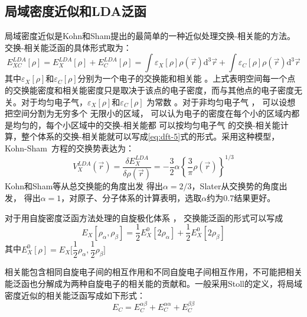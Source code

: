 \subsection{局域密度近似和LDA泛函}
局域密度近似是Kohn和Sham提出的最简单的一种近似处理交换-相关能的方法。交换-相关能{泛函}的具体形式取为：
\begin{equation}
  \label{eq:dft-5}
E_{XC}^{LDA}[\rho]=E_X^{LDA}[\rho]+E_C^{LDA}[\rho]=\int\varepsilon_X[\rho]\rho(\vec{r}) \textrm{d}^3\vec{r}+\int\varepsilon_C[\rho]\rho(\vec{r}) \textrm{d}^3\vec{r}
\end{equation}
其中$\varepsilon_X[\rho]$和$\varepsilon_C[\rho]$分别为{一个电子的}交换能和相关能%
。上式表明空间每一个点的交换能密度和相关能密度只是取决于该点的电子密度，而与其他点的电子密度无关。对{于均匀电子气，}$\varepsilon_X[\rho]$和$\varepsilon_C[\rho]$%
{为常数%
。}对于非均匀电子气%
，%
{可以设想}把空间分割为无穷多个%
{无限}小的区域，%
{可以认为}电子的密度在每个小的区域内都是均匀的，每个小区域中的交换-相关能都%
{可以按}均匀电子气%
的交换-相关能{计算}，整个体系的交换-相关能就可以写成\eqref{eq:dft-5}式的形式。{采用}这种模型{，}%
\textrm{Kohn-Sham~}方程的交换势表达为：
\begin{equation} \label{eq:dft-6}
V_X^{LDA}(\vec{r}) =\dfrac {\delta E_X^{LDA}}{\delta\rho(\vec{r}) }=-\dfrac 32\alpha\left\{\dfrac3\pi\rho(\vec{r}) \right\}^{1/3}
\end{equation}
Kohn和Sham等从总交换能的角度出发%
{得}出$\alpha=2/3$\cite{PRA140-1133_1965}，Slater从交换势的角度出发，%
{得}出$\alpha=1$\cite{PR81-385_1951}，对原子、分子体系的计算表明，选取$\alpha$约为0.7\cite{AQC6-1_1972,Slater-4_1974}结果更好。

对于用自旋密度泛函方法处理的自旋极化体系%
，%
交换能{泛函的}形式可以写成\cite{PRA20-397_1979}
\begin{equation} \label{eq:dft-7}
E_X[\rho_{\alpha},\rho_{\beta}]=\frac12E_X^{0}[2\rho_{\alpha}]+\frac12E_X^{0}[2\rho_{\beta}]
\end{equation}
其中$E_X^{0}[\rho]=E_X\bigl[\dfrac 12\rho_{\alpha},\dfrac 12\rho_{\beta}\bigr]$

相关能包含相同自旋电子间的相互作用和不同自旋电子间相互作用，不可能把相关能泛函也分解成为两种自旋电子的相关能的贡献和。一般采用Stoll\cite{TCA49-143_1978}的定义，将局域密度近似的相关能泛函写成如下形式：
\begin{equation}
  E_C=E_C^{\alpha\beta}+E_C^{\alpha\alpha}+E_C^{\beta\beta}
  \label{eq:dft-17}
\end{equation}

